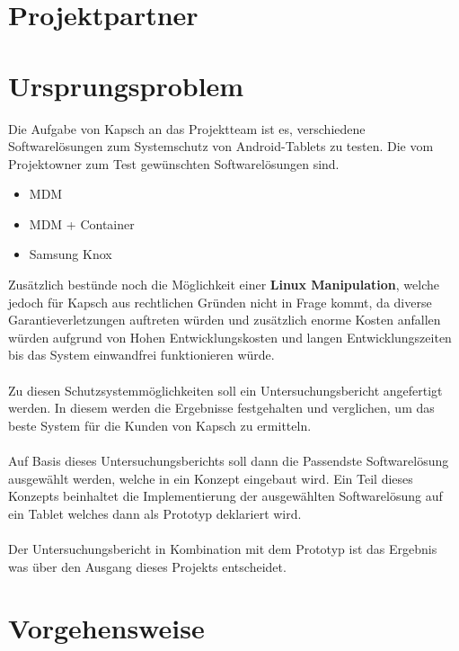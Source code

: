 \section{Projektpartner}

\section{Ursprungsproblem}
Die Aufgabe von Kapsch an das Projektteam ist es, verschiedene Softwarelösungen zum Systemschutz von Android-Tablets zu testen. Die vom Projektowner zum Test gewünschten Softwarelösungen sind.
\begin{itemize}
	\item MDM
	\item MDM + Container
	\item Samsung Knox
\end{itemize}
Zusätzlich bestünde noch die Möglichkeit einer \textbf {Linux Manipulation}, welche jedoch für Kapsch aus rechtlichen Gründen nicht in Frage kommt, da diverse Garantieverletzungen auftreten würden und zusätzlich enorme Kosten anfallen würden aufgrund von Hohen Entwicklungskosten und langen Entwicklungszeiten bis das System einwandfrei funktionieren würde.
\paragraph*{}
Zu diesen Schutzsystemmöglichkeiten soll ein Untersuchungsbericht angefertigt werden. In diesem werden die Ergebnisse  festgehalten und verglichen, um das beste System für die Kunden von Kapsch zu ermitteln.
\paragraph*{}
Auf Basis dieses Untersuchungsberichts soll dann die Passendste Softwarelösung ausgewählt werden, welche in ein Konzept eingebaut wird. Ein Teil dieses Konzepts beinhaltet die Implementierung der ausgewählten Softwarelösung auf ein Tablet welches dann als Prototyp deklariert wird. 
\paragraph*{}
Der Untersuchungsbericht in Kombination mit dem Prototyp ist das Ergebnis was über den Ausgang dieses Projekts entscheidet.


\section{Vorgehensweise}
